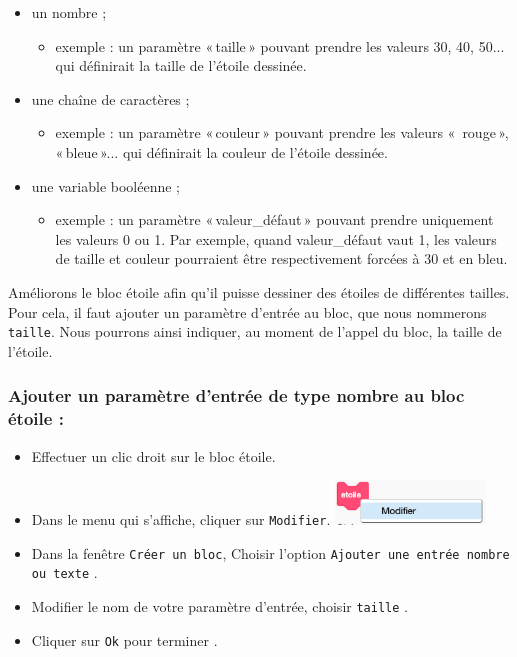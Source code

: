 \begin{itemize}
\item un nombre ;
  \begin{itemize}
   \item exemple : un paramètre «\,taille\,» pouvant prendre les valeurs 30, 40, 50... qui définirait la taille de l’étoile dessinée.
  \end{itemize}
\item une chaîne de caractères ;
  \begin{itemize}
     \item exemple : un paramètre «\,couleur\,» pouvant prendre les valeurs «\, rouge\,», «\,bleue\,»... qui définirait la couleur de l’étoile dessinée.
  \end{itemize}
\item une variable booléenne ;
  \begin{itemize}
    \item exemple : un paramètre «\,valeur\_défaut\,» pouvant prendre uniquement les valeurs 0 ou 1. Par exemple, quand valeur\_défaut vaut 1, les valeurs de taille et couleur pourraient être respectivement forcées à 30 et en bleu.
  \end{itemize}
\end{itemize}

\vspace{10pt}
Améliorons le bloc étoile afin qu’il puisse dessiner des étoiles de différentes tailles. Pour cela, il faut ajouter un paramètre d’entrée au bloc, que nous nommerons \texttt{taille}. Nous pourrons ainsi indiquer, au moment de l’appel du bloc, la taille de l’étoile.

\subsubsection{Ajouter un paramètre d’entrée de type nombre au bloc étoile :}

\begin{itemize}
\item Effectuer un clic droit sur le bloc étoile.
\item Dans le menu qui s’affiche, cliquer sur \texttt{Modifier}.
\includegraphics[width=4cm]{./images/scratch03/fonction/modifierBloc.png} 
\item Dans la fenêtre \texttt{Créer un bloc}, Choisir l’option \texttt{Ajouter une entrée nombre ou texte} .
\item Modifier le nom de votre paramètre d’entrée, choisir \texttt{taille} .
\item Cliquer sur \texttt{Ok} pour terminer .
\end{itemize}

